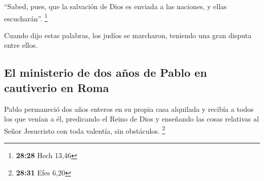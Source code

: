  ``Sabed, pues, que la salvación de Dios es enviada a las
naciones, y ellas escucharán''. \footnote{\textbf{28:28} Hech 13,46}

 Cuando dijo estas palabras, los judíos se marcharon,
teniendo una gran disputa entre ellos.

\hypertarget{el-ministerio-de-dos-auxf1os-de-pablo-en-cautiverio-en-roma}{%
\subsection{El ministerio de dos años de Pablo en cautiverio en
Roma}\label{el-ministerio-de-dos-auxf1os-de-pablo-en-cautiverio-en-roma}}

 Pablo permaneció dos años enteros en su propia casa
alquilada y recibía a todos los que venían a él, 
predicando el Reino de Dios y enseñando las cosas relativas al Señor
Jesucristo con toda valentía, sin obstáculos. \footnote{\textbf{28:31}
  Efes 6,20}
